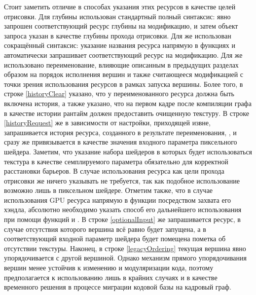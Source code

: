 Стоит заметить отличие в способах указания этих ресурсов в качестве целей отрисовки.
Для глубины использован стандартный полный синтаксис: явно запрошен соответствующий ресурс глубины на модификацию, и затем объект запроса указан в качестве глубины прохода отрисовки.
Для  же использован сокращённый синтаксис: указание названия ресурса напрямую в функциях  и  автоматически запрашивает соответствующий ресурс на модификацию.
Для  же использовано переименование, влияющие описанным в предыдущих разделах образом на порядок исполнения вершин и также считающееся модификацией с точки зрения использования ресурсов в рамках запуска вершины.
Более того, в строке \ref{historyClear} указано, что у переименованного ресурса должна быть включена история, а также указано, что на первом кадре после компиляции графа в качестве истории рантайм должен предоставить очищенную текстуру.
В строке \ref{historyRequest} же в зависимости от настройки, приходящей извне, запрашивается история ресурса, созданного в результате переименования, , и сразу же привязывается в качестве значения входного параметра  пиксельного шейдера.
Заметим, что указание набора шейдеров в которых будет использоваться текстура в качестве семплируемого параметра обязательно для корректной расстановки барьеров.
В случае использования ресурса как цели прохода отрисовки же ничего указывать не требуется, так как подобное использование возможно лишь в пиксельном шейдере.
Отметим также, что в случае использования GPU ресурса напрямую в функции посредством захвата его хэндла, абсолютно необходимо указать способ его дальнейшего использования при помощи функций  и .
В строке \ref{optionalInput} же запрашивается  ресурс, в случае отсутствия которого вершина всё равно будет запущена, а в соответствующий входной параметр шейдера будет помещена пометка об отсутствии текстуры.
Наконец, в строке \ref{legacyOrdering} текущая вершина явно упорядочивается с другой вершиной.
Однако механизм прямого упорядочивания вершин менее устойчив к изменению и модуляризации кода, поэтому предполагается к использованию лишь в крайних случаях и в качестве временного решения в процессе миграции кодовой базы на кадровый граф.

